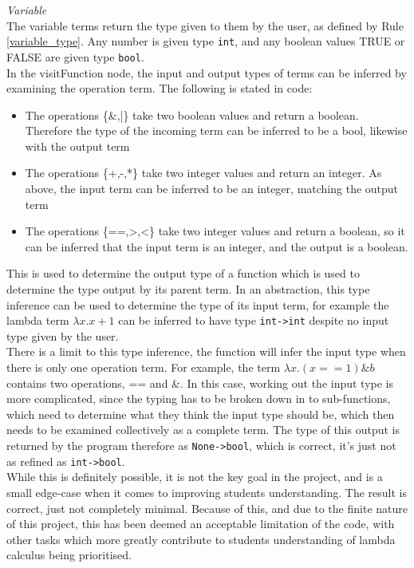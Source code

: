 \documentclass[a4paper,12pt]{report}
\begin{document}
\textit{Variable}\\
The variable terms return the type given to them by the user, as defined by Rule \ref{variable_type}. Any number is given type \texttt{int}, and any boolean values TRUE or FALSE are given type \texttt{bool}.\\

In the visitFunction node, the input and output types of terms can be inferred by examining the operation term. The following is stated in code:

\begin{itemize}
	\item The operations \{\&,|\} take two boolean values and return a boolean. Therefore the type of the incoming term can be inferred to be a bool, likewise with the output term
	\item The operations \{+,-,*\} take two integer values and return an integer. As above, the input term can be inferred to be an integer, matching the output term
	\item The operations \{==,>,<\} take two integer values and return a boolean, so it can be inferred that the input term is an integer, and the output is a boolean. 
\end{itemize}

This is used to determine the output type of a function which is used to determine the type output by its parent term. In an abstraction, this type inference can be used to determine the type of its input term, for example the lambda term $\lambda x.x+1$ can be inferred to have type \texttt{int->int} despite no input type given by the user.\\

There is a limit to this type inference, the function will infer the input type when there is only one operation term. For example, the term $\lambda x.(x==1)\&b$ contains two operations, == and \&. In this case, working out the input type is more complicated, since the typing has to be broken down in to sub-functions, which need to determine what they think the input type should be, which then needs to be examined collectively as a complete term. The type of this output is returned by the program therefore as \texttt{None->bool}, which is correct, it's just not as refined as \texttt{int->bool}.\\

While this is definitely possible, it is not the key goal in the project, and is a small edge-case when it comes to improving students understanding. The result is correct, just not completely minimal. Because of this, and due to the finite nature of this project, this has been deemed an acceptable limitation of the code, with other tasks which more greatly contribute to students understanding of lambda calculus being prioritised.
\end{document}
